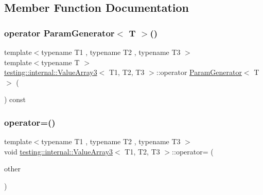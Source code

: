 \subsection{Member Function Documentation}
\mbox{\label{classtesting_1_1internal_1_1_value_array3_a4922d1cf7af801e82bdead15817b23fc}} 
\subsubsection{\texorpdfstring{operator ParamGenerator$<$ T $>$()}{operator ParamGenerator< T >()}}
{\footnotesize\ttfamily template$<$typename T1 , typename T2 , typename T3 $>$ \\
template$<$typename T $>$ \\
\mbox{\hyperlink{classtesting_1_1internal_1_1_value_array3}{testing\+::internal\+::\+Value\+Array3}}$<$ T1, T2, T3 $>$\+::operator \mbox{\hyperlink{classtesting_1_1internal_1_1_param_generator}{Param\+Generator}}$<$ T $>$ (\begin{DoxyParamCaption}{ }\end{DoxyParamCaption}) const\hspace{0.3cm}{\ttfamily [inline]}}

\mbox{\label{classtesting_1_1internal_1_1_value_array3_a916b3dbd999ad49477e8482c4c72d00b}} 
\subsubsection{\texorpdfstring{operator=()}{operator=()}}
{\footnotesize\ttfamily template$<$typename T1 , typename T2 , typename T3 $>$ \\
void \mbox{\hyperlink{classtesting_1_1internal_1_1_value_array3}{testing\+::internal\+::\+Value\+Array3}}$<$ T1, T2, T3 $>$\+::operator= (\begin{DoxyParamCaption}\item[{const \mbox{\hyperlink{classtesting_1_1internal_1_1_value_array3}{Value\+Array3}}$<$ T1, T2, T3 $>$ \&}]{other }\end{DoxyParamCaption})\hspace{0.3cm}{\ttfamily [private]}}



